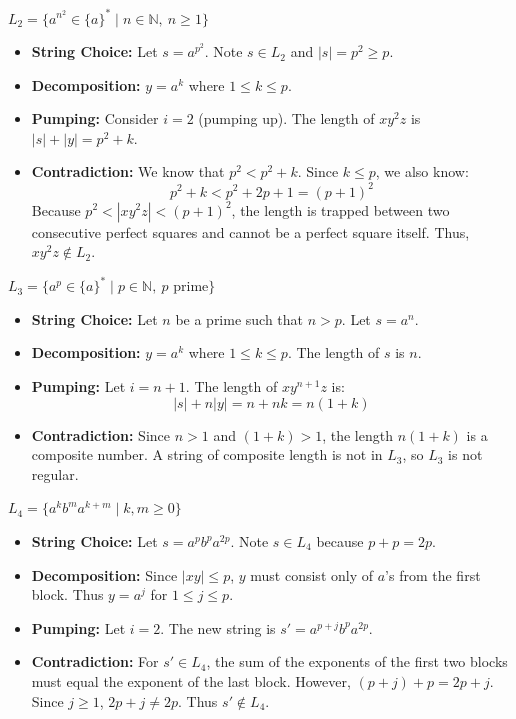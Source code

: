 \documentclass{article}
\theoremstyle{theorem}
\theoremstyle{definition}
\theoremstyle{remark}
\begin{document}
\textbf{$L_2 = \{ a^{n^2} \in \{a\}^* \; | \; n \in \mathbb N, ~ n \ge 1 \}$}
\begin{itemize}
    \item \textbf{String Choice:} Let $s = a^{p^2}$. Note $s \in L_2$ and $|s| = p^2 \ge p$.
    \item \textbf{Decomposition:} $y = a^k$ where $1 \le k \le p$.
    \item \textbf{Pumping:} Consider $i=2$ (pumping up). The length of $xy^2z$ is $|s| + |y| = p^2 + k$.
    \item \textbf{Contradiction:} We know that $p^2 < p^2 + k$. Since $k \le p$, we also know:
    \[ p^2 + k < p^2 + 2p + 1 = (p+1)^2 \]
    Because $p^2 < |xy^2z| < (p+1)^2$, the length is trapped between two consecutive perfect squares and cannot be a perfect square itself. Thus, $xy^2z \notin L_2$.
\end{itemize}

\textbf{$L_3 = \{ a^p \in \{a\}^\ast \; | \; p \in \mathbb N, ~ p\,\,\mathrm{prime} \}$}
\begin{itemize}
    \item \textbf{String Choice:} Let $n$ be a prime such that $n > p$. Let $s = a^n$.
    \item \textbf{Decomposition:} $y = a^k$ where $1 \le k \le p$. The length of $s$ is $n$.
    \item \textbf{Pumping:} Let $i = n+1$. The length of $xy^{n+1}z$ is:
    \[ |s| + n|y| = n + nk = n(1+k) \]
    \item \textbf{Contradiction:} Since $n > 1$ and $(1+k) > 1$, the length $n(1+k)$ is a composite number. A string of composite length is not in $L_3$, so $L_3$ is not regular.
\end{itemize}

\textbf{$L_4 = \{ a^k b^m a^{k+m} \; | \; k,m \geq 0\}$}
\begin{itemize}
    \item \textbf{String Choice:} Let $s = a^p b^p a^{2p}$. Note $s \in L_4$ because $p + p = 2p$.
    \item \textbf{Decomposition:} Since $|xy| \le p$, $y$ must consist only of $a$'s from the first block. Thus $y = a^j$ for $1 \le j \le p$.
    \item \textbf{Pumping:} Let $i = 2$. The new string is $s' = a^{p+j} b^p a^{2p}$.
    \item \textbf{Contradiction:} For $s' \in L_4$, the sum of the exponents of the first two blocks must equal the exponent of the last block. However, $(p+j) + p = 2p + j$. Since $j \ge 1$, $2p + j \neq 2p$. Thus $s' \notin L_4$.
\end{itemize}
\end{document}
